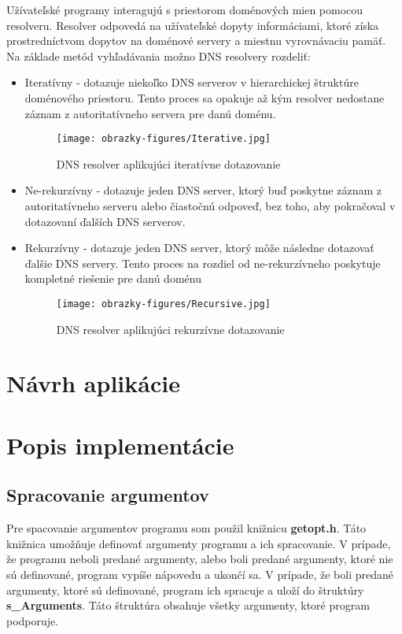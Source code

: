 Užívateľské programy interagujú s priestorom doménových mien pomocou resolveru. Resolver odpovedá na užívateľské dopyty informáciami, ktoré získa prostredníctvom dopytov na doménové servery a miestnu vyrovnávaciu pamäť. Na základe metód vyhľadávania možno DNS resolvery rozdeliť:
\begin{itemize}
    \item Iteratívny - dotazuje niekoľko DNS serverov v hierarchickej štruktúre doménového priestoru. Tento proces sa opakuje až kým resolver nedostane záznam z autoritatívneho servera pre danú doménu.
    \begin{figure}[ht]
        \centering     %
        \texttt{[image: obrazky-figures/Iterative.jpg]}
        \caption{DNS resolver aplikujúci iteratívne dotazovanie}
        \label{fig:iterative-DNS-resolver}
    \end{figure}
    
    \item Ne-rekurzívny - dotazuje jeden DNS server, ktorý buď poskytne záznam z autoritatívneho serveru alebo čiastočnú odpoveď, bez toho, aby pokračoval v dotazovaní ďalších DNS serverov.
    
    \item Rekurzívny - dotazuje jeden DNS server, ktorý môže následne dotazovať ďalšie DNS servery. Tento proces na rozdiel od ne-rekurzívneho poskytuje kompletné riešenie pre danú doménu
    
    \begin{figure}[ht]
        \centering     %
        \texttt{[image: obrazky-figures/Recursive.jpg]}
        \caption{DNS resolver aplikujúci rekurzívne dotazovanie}
        \label{fig:your-label}
    \end{figure}
\end{itemize}



\chapter{Návrh aplikácie}

\chapter{Popis implementácie}

\section{Spracovanie argumentov}
Pre spacovanie argumentov programu som použil knižnicu \textbf{getopt.h}. Táto knižnica umožňuje definovať argumenty programu a ich spracovanie. V prípade, že programu neboli predané argumenty, alebo boli predané argumenty, ktoré nie sú definované, program vypíše nápovedu a ukončí sa. V prípade, že boli predané argumenty, ktoré sú definované, program ich spracuje a uloží do štruktúry \textbf{s\_Arguments}. Táto štruktúra obsahuje všetky argumenty, ktoré program podporuje.

